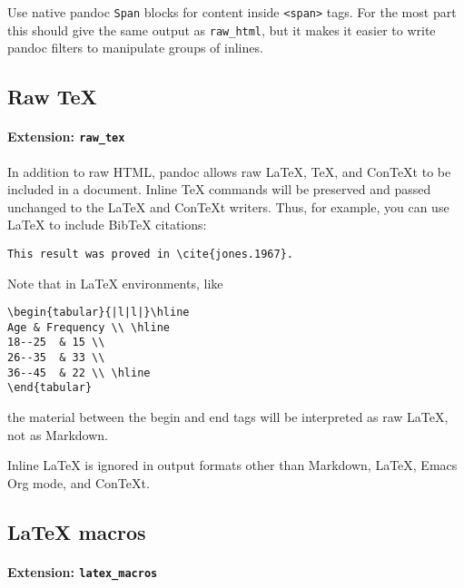 \documentclass[]{article}
\let\oldparagraph\paragraph
\renewcommand{\paragraph}[1]{\oldparagraph{#1}\mbox{}}
\begin{document}
Use native pandoc \texttt{Span} blocks for content inside
\texttt{\textless{}span\textgreater{}} tags. For the most part this
should give the same output as \texttt{raw\_html}, but it makes it
easier to write pandoc filters to manipulate groups of inlines.

\subsection{Raw TeX}\label{raw-tex}

\paragraph{\texorpdfstring{Extension:
\texttt{raw\_tex}}{Extension: raw\_tex}}\label{extension-raw_tex}

In addition to raw HTML, pandoc allows raw LaTeX, TeX, and ConTeXt to be
included in a document. Inline TeX commands will be preserved and passed
unchanged to the LaTeX and ConTeXt writers. Thus, for example, you can
use LaTeX to include BibTeX citations:

\begin{verbatim}
This result was proved in \cite{jones.1967}.
\end{verbatim}

Note that in LaTeX environments, like

\begin{verbatim}
\begin{tabular}{|l|l|}\hline
Age & Frequency \\ \hline
18--25  & 15 \\
26--35  & 33 \\
36--45  & 22 \\ \hline
\end{tabular}
\end{verbatim}

the material between the begin and end tags will be interpreted as raw
LaTeX, not as Markdown.

Inline LaTeX is ignored in output formats other than Markdown, LaTeX,
Emacs Org mode, and ConTeXt.

\subsection{LaTeX macros}\label{latex-macros}

\paragraph{\texorpdfstring{Extension:
\texttt{latex\_macros}}{Extension: latex\_macros}}\label{extension-latex_macros}
\end{document}
